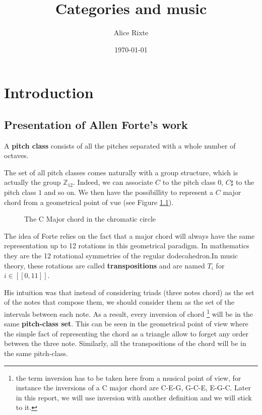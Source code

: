 \documentclass{report}
\begin{document}
\title{Categories and music}
\author{Alice Rixte}
\date{\today}
\maketitle %


\chapter{Introduction}


\section{Presentation of Allen Forte's work}
\begin{defn}
    A \textbf{pitch class} consists of all the pitches separated with a whole number of octaves.
\end{defn}
The set of all pitch classes comes naturally with a group structure, which is actually the group $\mathbb{Z}_{12}$. Indeed, we can associate $C$ to the pitch class $0$, $C\sharp$ to the pitch class $1$ and so on. We then have the possibillity to represent a $C$ major chord  from a geometrical point of vue (see Figure \ref{Cmajor}).

\setcounter{itemcount}{450}
\renewcommand*{\do}[1]{
    \filldraw [black]  (\number\value{itemcount}:3cm) circle (1.5pt)
    node[anchor={\number\value{itemcount}-180}]
        {#1\addtocounter{itemcount}{-30}};
}

\begin{figure}[ht]
    \centering
    \caption{The C Major chord in the chromatic circle}
    \label{Cmajor}
\end{figure}

The idea of Forte relies on the fact that a major chord will always have the same representation up to 12 rotations in this geometrical paradigm. In mathematics they are the 12 rotational symmetries of the regular dodecahedron.In music theory, these rotations are called \textbf{transpositions} and are named $T_i$ for $i\in[\![0,11]\!]$.

His intuition was that instead of considering triads (three notes chord) as the set of the notes that compose them, we should consider them as the set of the intervals between each note. As a result, every inversion of chord \footnote{the term inversion has to be taken here from a musical point of view, for instance the inversions of a C major chord are C-E-G, G-C-E, E-G-C. Later in this report, we will use inversion with another definition and we will stick to it.} will be in the same \textbf{pitch-class set}\cite{forte_1980}. This can be seen in the geometrical point of view where the simple fact  of representing the chord as a triangle allow to forget any order between the three note. Similarly, all the transpositions of the chord will be in the same pitch-class.
\end{document}
